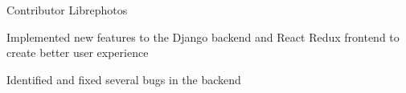 

\begin{cventries}

  \cventry
    {Contributor} %
    {Librephotos} %
    {} %
    {} %
    {
        \begin{cvitems}
          \item {Implemented new features to the Django backend and React Redux frontend to create better user experience}
          \item {Identified and fixed several bugs in the backend}
        \end{cvitems}
    }



\end{cventries}

